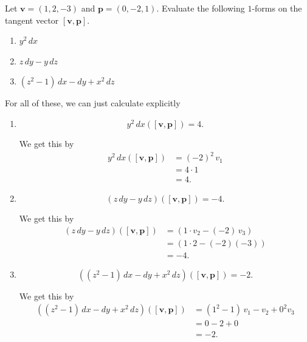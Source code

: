 \documentclass[12 pt, letterpaper]{hmcpset}
\begin{document}
\begin{problem}[Problem 2]
	Let $\mathbf v = (1, 2, -3)$ and $\mathbf p = (0, -2, 1)$. Evaluate the following $1$-forms on the tangent vector $[\mathbf v, \mathbf p]$.
	\begin{enumerate}
		\item $y^2 \, dx$
		\item $z \, dy - y \, dz$
		\item $(z^2 - 1) \, dx - dy + x^2 \, dz$
	\end{enumerate}
\end{problem}

\begin{solution}
	For all of these, we can just calculate explicitly
	\begin{enumerate}
		\item 
			\[
				\boxed{
					y^2 \, dx ([\mathbf v, \mathbf p]) = 4.
				}
			\]

			We get this by
			\[
				\begin{split}
					y^2 \, dx([\mathbf v, \mathbf p]) & = (-2)^2 \, v_1 \\
									  & = 4 \cdot 1 \\
									  & = 4.
				\end{split}
			\]
		\item
			\[
				\boxed{
					(z \, dy - y \, dz)([\mathbf v, \mathbf p]) = -4.
				}
			\]

			We get this by
			\[
				\begin{split}
					(z \, dy - y \, dz)([\mathbf v, \mathbf p]) & = (1 \cdot v_2 - (-2) \, v_3) \\
										    & = (1 \cdot 2 - (-2)(-3)) \\
										    & = -4.
				\end{split}
			\]
		\item
			\[
				\boxed{
					((z^2 - 1) \, dx - dy + x^2 \, dz)([\mathbf v, \mathbf p]) = -2.
				}
			\]

			We get this by
			\[
				\begin{split}
					((z^2 - 1) \, dx - dy + x^2 \, dz)([\mathbf v, \mathbf p]) & = (1^2 - 1) \, v_1 - v_2 + 0^2 v_3 \\
												   & = 0 - 2 + 0 \\
												   & = -2.
				\end{split}
			\]
	\end{enumerate}
\end{solution}

\pagebreak
\end{document}
